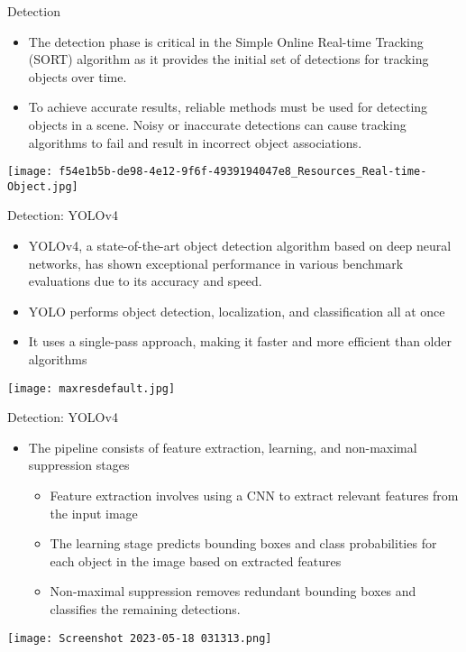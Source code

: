 \documentclass{beamer}
\begin{document}
\begin{frame}[t]{Detection}
\begin{itemize}
\item The detection phase is critical in the Simple Online Real-time Tracking (SORT) algorithm as it
provides the initial set of detections for tracking objects over time. 
\item To achieve accurate results, reliable methods must be used for detecting objects in a scene. Noisy or inaccurate detections can cause tracking algorithms to fail and result in incorrect object associations.
\end{itemize}
\begin{center}
\texttt{[image: f54e1b5b-de98-4e12-9f6f-4939194047e8\_Resources\_Real-time-Object.jpg]}
\end{center}
\end{frame}

\begin{frame}[t]{Detection: YOLOv4}
\begin{itemize}
\item YOLOv4, a state-of-the-art object detection algorithm based
on deep neural networks, has shown exceptional performance in various benchmark evaluations
due to its accuracy and speed.
\item YOLO performs object detection, localization, and classification all at once
\item It uses a single-pass approach, making it faster and more efficient than older algorithms
\end{itemize}
\begin{center}
\texttt{[image: maxresdefault.jpg]}
\end{center}
\end{frame}

\begin{frame}[t]{Detection: YOLOv4}
\begin{itemize}
\item The pipeline consists of feature extraction, learning, and non-maximal suppression stages
	\begin{itemize}
	\item Feature extraction involves using a CNN to extract relevant features from the input image
\item The learning stage predicts bounding boxes and class probabilities for each object in the image based on extracted features
\item Non-maximal suppression removes redundant bounding boxes and classifies the remaining detections.
	\end{itemize}
\end{itemize}
\begin{center}
\texttt{[image: Screenshot 2023-05-18 031313.png]}
\end{center}
\end{frame}
\end{document}
